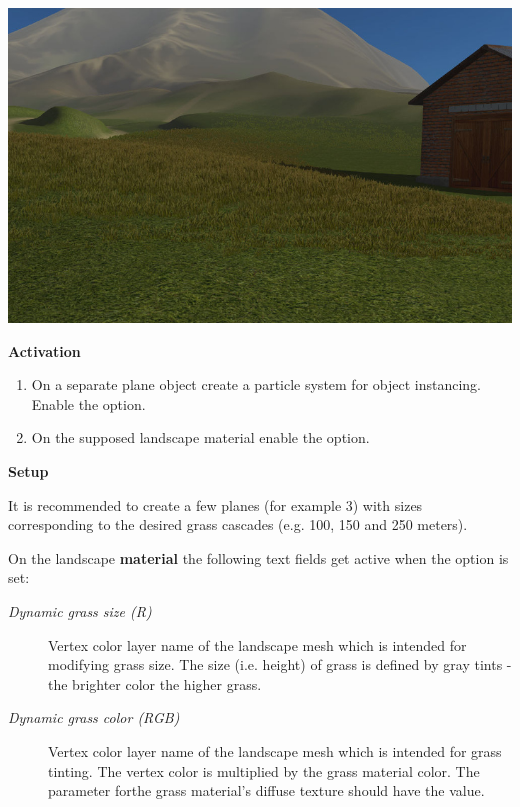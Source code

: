 \documentclass[a4paper,12pt,oneside]{sphinxmanual}
\begin{document}
{\hfill\includegraphics[width=1.000\linewidth]{dynamic_grass.jpg}\hfill}

\begin{DUlineblock}{0em}
\item[] 
\end{DUlineblock}

\textbf{Activation}
\begin{enumerate}
\item {} 
On a separate plane object create a particle system for object instancing. Enable the  option.

\item {} 
On the supposed landscape material enable the  option.

\end{enumerate}

\textbf{Setup}

It is recommended to create a few planes (for example 3) with sizes corresponding to the desired grass cascades (e.g. 100, 150 and 250 meters).

On the landscape \textbf{material} the following text fields get active when the  option is set:
\begin{description}
\item[{\emph{Dynamic grass size (R)}}] \leavevmode
Vertex color layer name of the landscape mesh which is intended for modifying grass size. The size (i.e. height) of grass is defined by gray tints - the brighter color the higher grass.

\item[{\emph{Dynamic grass color (RGB)}}] \leavevmode
Vertex color layer name of the landscape mesh which is intended for grass tinting. The vertex color is multiplied by the grass material color. The  parameter forthe grass material's diffuse texture should have the  value.

\end{description}
\end{document}
